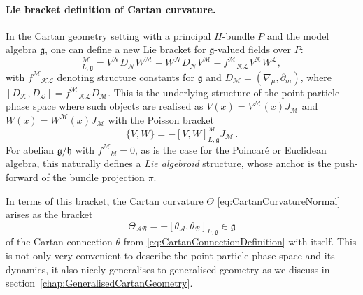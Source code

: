 \documentclass[11pt,a4paper]{article}
\numberwithin{equation}{section}
\begin{document}
\paragraph{Lie bracket definition of Cartan curvature.} In the Cartan geometry setting with a principal $H$-bundle $P$ and the model algebra $\mathfrak{g}$, one can define a new Lie bracket for $\mathfrak{g}$-valued fields over $P$:
\begin{equation}
    [V,W]_{L,\mathfrak{g}}^{\mathcal{M}} = V^{\mathcal{N}} D_{\mathcal{N}} W^{\mathcal{M}} - W^{\mathcal{N}} D_{\mathcal{N}} V^{\mathcal{M}} - {f^{\mathcal{M}}}_{\mathcal{KL}} V^{\mathcal{K}} W^{\mathcal{L}}, \label{eq:CartanGeometryLieBracket}
\end{equation}
with ${f^{\mathcal{M}}}_{\mathcal{KL}}$ denoting structure constants for $\mathfrak{g}$ and $D_{\mathcal{M}} = ( \nabla_\mu , \partial_m)$, where $[D_\mathcal{K},D_\mathcal{L}] = f^\mathcal{M}{}_{\mathcal{KL}} D_\mathcal{M}$. %
This is the underlying structure of the point particle phase space where such objects are realised as $V(x) = V^{\mathcal{M}}(x) J_{\mathcal{M}}$ and $W(x) = W^{\mathcal{M}}(x) J_{\mathcal{M}}$ with the Poisson bracket
\begin{equation}
  \{ V, W \} = - [ V, W ]_{L,\mathfrak{g}}^{\mathcal{M}} J_{\mathcal{M}}\,.
\end{equation}
For abelian $\mathfrak{g}/\mathfrak{h}$ with ${f^{\mathcal{M}}}_{kl}=0$, as is the case for the Poincar\'e or Euclidean algebra, this naturally defines a \textit{Lie algebroid} structure, whose anchor is the push-forward of the bundle projection $\pi$. 

In terms of this bracket, the Cartan curvature $\Theta$ \eqref{eq:CartanCurvatureNormal} arises as the bracket
\begin{equation}
    {\Theta}_{\mathcal{AB}} = - [\theta_{\mathcal{A}},\theta_{\mathcal{B}}]_{L,\mathfrak{g}} \in \mathfrak{g} \label{eq:CartanCurvatureOrdLieBracketRealisation}
\end{equation}
of the Cartan connection $\theta$ from \eqref{eq:CartanConnectionDefinition} with itself. This is not only very convenient to describe the point particle phase space and its dynamics, it also nicely generalises to generalised geometry as we discuss in section~\ref{chap:GeneralisedCartanGeometry}.
\end{document}

